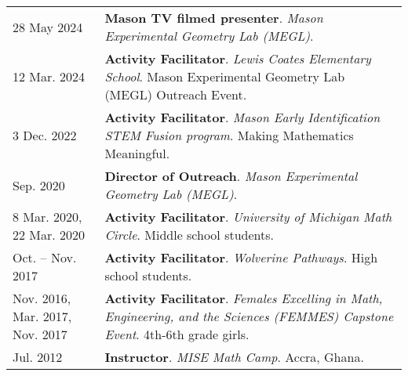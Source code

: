     \begin{center}
    {
    \renewcommand{\arraystretch}{1.2}
    \begin{longtable}{p{}  p{}}
    28 May  2024 & \textbf{Mason TV filmed presenter}. \textit{Mason Experimental Geometry Lab (MEGL)}.  \\ 
12 Mar.  2024 & \textbf{Activity Facilitator}. \textit{Lewis Coates Elementary School}.  Mason Experimental Geometry Lab (MEGL) Outreach Event.  \\ 
3 Dec.  2022 & \textbf{Activity Facilitator}. \textit{Mason Early Identification STEM Fusion program}.  Making Mathematics Meaningful.  \\ 
 Sep.  2020 & \textbf{Director of Outreach}. \textit{Mason Experimental Geometry Lab (MEGL)}.  \\ 
8 Mar.  2020, 22 Mar.  2020 & \textbf{Activity Facilitator}. \textit{University of Michigan Math Circle}.  Middle school students.  \\ 
 Oct.  --  Nov.  2017 & \textbf{Activity Facilitator}. \textit{Wolverine Pathways}.  High school students.  \\ 
 Nov.  2016,  Mar.  2017,  Nov.  2017 & \textbf{Activity Facilitator}. \textit{Females Excelling in Math, Engineering, and the Sciences (FEMMES) Capstone Event}.  4th-6th grade girls.  \\ 
 Jul.  2012 & \textbf{Instructor}. \textit{MISE Math Camp}.  Accra, Ghana.  
    \end{longtable}
    } 
    \end{center}

    \vspace{-1em}
    